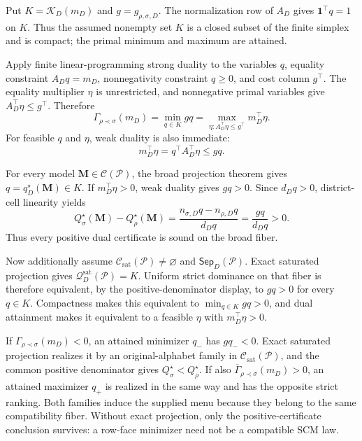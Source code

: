 Put \(K=\mathcal K_D(m_D)\) and \(g=g_{\rho,\sigma,D}\).  The normalization row of \(A_D\) gives \(\mathbf 1^\top q=1\) on \(K\).  Thus the assumed nonempty set \(K\) is a closed subset of the finite simplex and is compact; the primal minimum and maximum are attained.

Apply finite linear-programming strong duality to the variables \(q\), equality constraint \(A_Dq=m_D\), nonnegativity constraint \(q\geq0\), and cost column \(g^\top\).  The equality multiplier \(\eta\) is unrestricted, and nonnegative primal variables give \(A_D^\top\eta\leq g^\top\).  Therefore
\[
\Gamma_{\rho\prec\sigma}(m_D)
=\min_{q\in K}gq
=\max_{\eta:A_D^\top\eta\leq g^\top}m_D^\top\eta.
\]
For feasible \(q\) and \(\eta\), weak duality is also immediate:
\[
m_D^\top\eta=q^\top A_D^\top\eta\leq gq.
\]

For every model \(\mathbf M\in\mathcal C(\mathcal P)\), the broad projection theorem gives \(q=q_D^\star(\mathbf M)\in K\).  If \(m_D^\top\eta>0\), weak duality gives \(gq>0\).  Since \(d_Dq>0\), district-cell linearity yields
\[
Q_\sigma^\star(\mathbf M)-Q_\rho^\star(\mathbf M)
=\frac{n_{\sigma,D}q-n_{\rho,D}q}{d_Dq}
=\frac{gq}{d_Dq}>0.
\]
Thus every positive dual certificate is sound on the broad fiber.

Now additionally assume \(\mathcal C_{\mathrm{sat}}(\mathcal P)\ne\varnothing\) and \(\mathsf{Sep}_D(\mathcal P)\).  Exact saturated projection gives \(\mathcal Q_D^{\mathrm{sat}}(\mathcal P)=K\).  Uniform strict dominance on that fiber is therefore equivalent, by the positive-denominator display, to \(gq>0\) for every \(q\in K\).  Compactness makes this equivalent to \(\min_{q\in K}gq>0\), and dual attainment makes it equivalent to a feasible \(\eta\) with \(m_D^\top\eta>0\).

If \(\Gamma_{\rho\prec\sigma}(m_D)<0\), an attained minimizer \(q_-\) has \(gq_-<0\).  Exact saturated projection realizes it by an original-alphabet family in \(\mathcal C_{\mathrm{sat}}(\mathcal P)\), and the common positive denominator gives \(Q_\sigma^\star<Q_\rho^\star\).  If also \(\overline\Gamma_{\rho\prec\sigma}(m_D)>0\), an attained maximizer \(q_+\) is realized in the same way and has the opposite strict ranking.  Both families induce the supplied menu because they belong to the same compatibility fiber.  Without exact projection, only the positive-certificate conclusion survives: a row-face minimizer need not be a compatible SCM law.